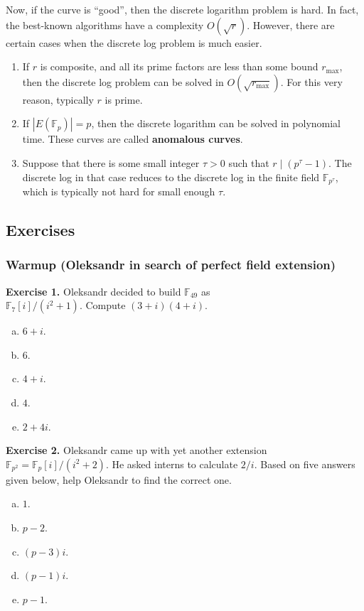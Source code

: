 \documentclass[../lecture-notes.tex]{subfiles}
\begin{document}
Now, if the curve is ``good'', then the discrete logarithm problem is hard. In fact, the best-known algorithms have a complexity $O(\sqrt{r})$. However, there are certain cases when the discrete log problem is much easier.
\begin{enumerate}
    \item If $r$ is composite, and all its prime factors are less than some bound $r_{\max}$, then the discrete log problem can be solved in $O(\sqrt{r_{\max}})$. For this very reason, typically $r$ is prime.
    \item If $|E(\mathbb{F}_p)|=p$, then the discrete logarithm can be solved in polynomial time. These curves are called \textbf{anomalous curves}.
    \item Suppose that there is some small integer $\tau>0$ such that $r \mid (p^{\tau}-1)$. The discrete log in that case reduces to the discrete log in the finite field $\mathbb{F}_{p^{\tau}}$, which is typically not hard for small enough $\tau$.
\end{enumerate}

\subsection{Exercises}
\subsubsection*{Warmup (Oleksandr in search of perfect field extension)}

\textbf{Exercise 1.} Oleksandr decided to build $\mathbb{F}_{49}$ as \\ $\mathbb{F}_7[i]/(i^2+1)$. Compute $(3+i)(4+i)$. 

\begin{enumerate}[a)]
    \item $6+i$.
    \item $6$.
    \item $4+i$.
    \item $4$.
    \item $2+4i$.
\end{enumerate}

\textbf{Exercise 2.} Oleksandr came up with yet another extension $\mathbb{F}_{p^2} = \mathbb{F}_p[i]/(i^2+2)$. He asked interns to calculate $2/i$. Based on five answers given below, help Oleksandr to find the correct one.
\begin{enumerate}[a)]
    \item $1$.
    \item $p-2$.
    \item $(p-3)i$.
    \item $(p-1)i$.
    \item $p-1$.
\end{enumerate}
\end{document}
